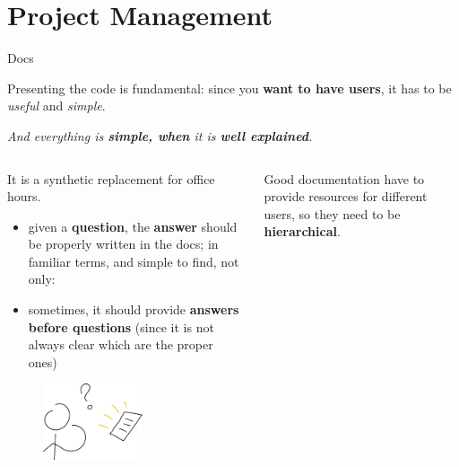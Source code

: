 \documentclass[9pt]{beamer}
\begin{document}
\section{Project Management}

\begin{frame}{Docs}
    \begin{center}
        Presenting the code is fundamental: since you \textbf{want to have
        users}, it has to be \textit{useful} and \textit{simple}.

        \textit{And everything is \textbf{simple, when} it is
        \alert{\textbf{well explained}}.}
    \end{center}
    \vspace*{10pt}

    \begin{columns}
        \begin{column}{0.35\textwidth}
            It is a synthetic replacement for office hours.
            \vspace*{10pt}

            \begin{itemize}
                \item given a \textbf{question}, the \textbf{answer} should be
                  properly written in the docs; in familiar terms, and simple
                  to find, not only: 
                \item sometimes, it should provide \textbf{answers before
                  questions} (since it is not always clear which are the proper
                  ones)
            \end{itemize}

            \begin{figure}
                \centering
                \includegraphics[width=0.6\textwidth]{question-docs}
            \end{figure}
        \end{column}
        \begin{column}{0.35\textwidth}
            Good documentation have to provide resources for different users,
            so they need to be \textbf{hierarchical}.
            \vspace*{10pt}


\end{column}
\end{columns}
\end{frame}
\end{document}
